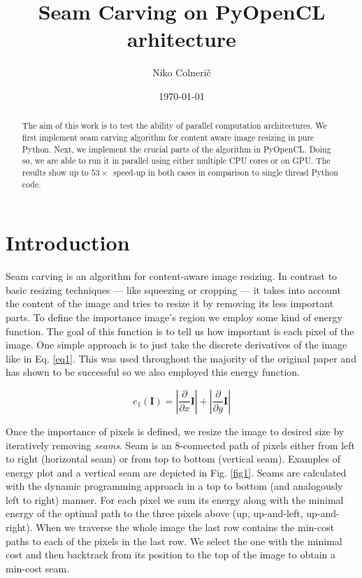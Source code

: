 \documentclass[a4paper,11pt]{article}
\title{Seam Carving on PyOpenCL arhitecture}
\author{Niko Colnerič}
\date{\today}
\begin{document}
\maketitle

\begin{abstract}
The aim of this work is to test the ability of parallel computation architectures.
We first implement seam carving algorithm for content aware image resizing in pure Python.
Next, we implement the crucial parts of the algorithm in PyOpenCL.
Doing so, we are able to run it in parallel using either multiple CPU cores or on GPU.
The results show up to $53\times$~speed-up in both cases in comparison to single thread Python code.
\end{abstract}

\section{Introduction}
Seam carving \cite{Avidan2007} is an algorithm for content-aware image resizing.
In contrast to basic resizing techniques — like squeezing or cropping — it takes into account the content of the image and tries to resize it by removing its less important parts.
To define the importance image's region we employ some kind of energy function.
The goal of this function is to tell us how important is each pixel of the image.
One simple approach is to just take the discrete derivatives of the image like in Eq. \ref{eq1}.
This was used throughout the majority of the original paper and has shown to be successful so we also employed this energy function.

\begin{equation}
e_1(\bm{I}) = \left| \frac{\partial}{\partial x} \bm{I} \right| + \left| \frac{\partial}{\partial y} \bm{I} \right|
\label{eq1}
\end{equation}

Once the importance of pixels is defined, we resize the image to desired size by iteratively removing \emph{seams}.
Seam is an 8-connected path of pixels either from left to right (horizontal seam) or from top to bottom (vertical seam).
Examples of energy plot and a vertical seam are depicted in Fig. \ref{fig1}.
Seams are calculated with the dynamic programming approach in a top to bottom (and analogously left to right) manner.
For each pixel we sum its energy along with the minimal energy of the optimal path to the three pixels above (up, up-and-left, up-and-right).
When we traverse the whole image the last row contains the min-cost paths to each of the pixels in the last row.
We select the one with the minimal cost and then backtrack from its position to the top of the image to obtain a min-cost seam.
\end{document}
